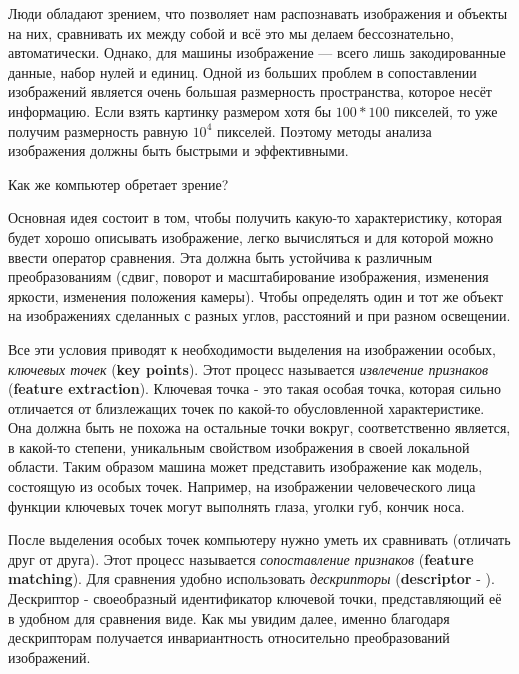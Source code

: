 Люди обладают зрением, что позволяет нам распознавать изображения и объекты на них, сравнивать их между собой и всё это мы делаем бессознательно, автоматически. Однако, для машины изображение — всего лишь закодированные данные, набор нулей и единиц. Одной из больших проблем в сопоставлении изображений является очень большая размерность пространства, которое несёт информацию. Если взять картинку размером хотя бы $100*100$ пикселей, то уже получим размерность равную $10^4$ пикселей. Поэтому методы анализа изображения должны быть быстрыми и эффективными.

Как же компьютер обретает зрение?

Основная идея состоит в том, чтобы получить какую-то характеристику, которая будет хорошо описывать изображение, легко вычисляться и для которой можно ввести оператор сравнения. Эта  должна быть устойчива к различным преобразованиям (сдвиг, поворот и масштабирование изображения, изменения яркости, изменения положения камеры). Чтобы определять один и тот же объект на изображениях сделанных с разных углов, расстояний и при разном освещении.

Все эти условия приводят к необходимости выделения на изображении особых, \textit{ключевых точек} (\textbf{key points}). Этот процесс называется \textit{извлечение признаков} (\textbf{feature extraction}). Ключевая точка - это такая особая точка, которая сильно отличается от близлежащих точек по какой-то обусловленной характеристике. Она должна быть не похожа на остальные точки вокруг, соответственно является, в какой-то степени, уникальным свойством изображения в своей локальной области. Таким образом машина может представить изображение как модель, состоящую из особых точек. Например, на изображении человеческого лица функции ключевых точек могут выполнять глаза, уголки губ, кончик носа.

После выделения особых точек компьютеру нужно уметь их сравнивать (отличать друг от друга). Этот процесс называется \textit{сопоставление признаков} (\textbf{feature matching}). Для сравнения удобно использовать \textit{дескрипторы} (\textbf{descriptor} - ). Дескриптор - своеобразный идентификатор ключевой точки, представляющий её в удобном для сравнения виде. Как мы увидим далее, именно благодаря дескрипторам получается инвариантность относительно преобразований изображений.
